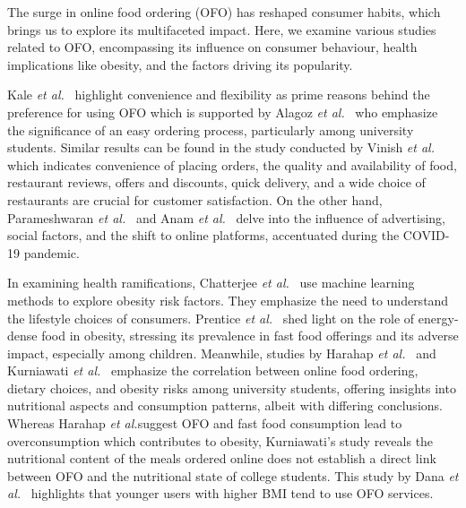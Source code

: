 \documentclass[a4paper,fleqn]{cas-sc}
\newcommand{\etal}{\textit{et al.}}
\begin{document}

The surge in online food ordering (OFO) has reshaped consumer habits, which brings us to explore its multifaceted impact. Here, we examine various studies related to OFO, encompassing its influence on consumer behaviour, health implications like obesity, and the factors driving its popularity.

Kale \etal~\cite{kale_customer_perception_2020} highlight convenience and flexibility as prime reasons behind the preference for using OFO which is supported by Alagoz \etal~\cite{alagoz_2012} who emphasize the significance of an easy ordering process, particularly among university students. Similar results can be found in the study conducted by Vinish \etal~\cite{vinish2021} which indicates convenience of placing orders, the quality and availability of food, restaurant reviews, offers and discounts, quick delivery, and a wide choice of restaurants are crucial for customer satisfaction. On the other hand, Parameshwaran \etal~\cite{parameshwaran_2020} and Anam \etal~\cite{anam_2021} delve into the influence of advertising, social factors, and the shift to online platforms, accentuated during the COVID-19 pandemic.

In examining health ramifications, Chatterjee \etal~\cite{chatterjee_2020} use machine learning methods to explore obesity risk factors. They emphasize the need to understand the lifestyle choices of consumers. Prentice \etal~\cite{prentice_2003} shed light on the role of energy-dense food in obesity, stressing its prevalence in fast food offerings and its adverse impact, especially among children. Meanwhile, studies by Harahap \etal~\cite{harahap_2020} and Kurniawati \etal~\cite{kurniawati_2021} emphasize the correlation between online food ordering, dietary choices, and obesity risks among university students, offering insights into nutritional aspects and consumption patterns, albeit with differing conclusions. Whereas Harahap \etal suggest OFO and fast food consumption lead to overconsumption which contributes to obesity, Kurniawati's study reveals the nutritional content of the meals ordered online does not establish a direct link between OFO and the nutritional state of college students. This study by Dana \etal~\cite{dana2021} highlights that younger users with higher BMI tend to use OFO services.
\end{document}
